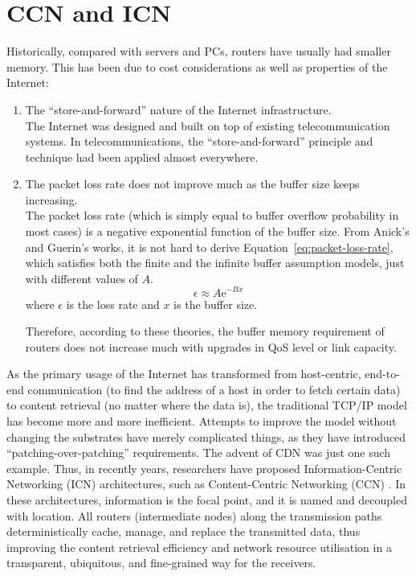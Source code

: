 \section{CCN and ICN}\label{sec:icn}
Historically, compared with servers and PCs, routers have usually had smaller memory. This has been due to cost considerations as well as properties of the Internet:
\begin{enumerate}
	\item The ``store-and-forward'' nature of the Internet infrastructure.\\
	The Internet was designed and built on top of existing telecommunication systems. In telecommunications, the ``store-and-forward'' principle and technique had been applied almost everywhere. 
	\item The packet loss rate does not improve much as the buffer size keeps increasing.\\
	The packet loss rate (which is simply equal to buffer overflow probability in most cases) is a negative exponential function of the buffer size. 
	From Anick's \cite{Anick1982Stochastic} and Guerin's \cite{Guerin1991Equivalent} works, it is not hard to derive Equation~\ref{eq:packet-loss-rate}, which satisfies both the finite and the infinite buffer assumption models, just with different values of $A$. 
	\begin{equation}\label{eq:packet-loss-rate}
	\epsilon \approx A\mathrm{e}^{-Bx}
	\end{equation}
	where $\epsilon$ is the loss rate and $x$ is the buffer size. 
	
	Therefore, according to these theories, the buffer memory requirement of routers does not increase much with upgrades in QoS level or link capacity. 
\end{enumerate}
	As the primary usage of the Internet has transformed from host-centric, end-to-end communication (to find the address of a host in order to fetch certain data) to content retrieval (no matter where the data is), the traditional TCP/IP model has become more and more inefficient. Attempts to improve the model without changing the substrates have merely complicated things, as they have introduced ``patching-over-patching'' requirements. The advent of CDN was just one such example. Thus, in recently years, researchers have proposed Information-Centric Networking (ICN) \cite{Xylomenos2014ICN} architectures, such as Content-Centric Networking (CCN) \cite{Perino:2011:CCN}. In these architectures, information is the focal point, and it is named and decoupled with location. All routers (intermediate nodes) along the transmission paths deterministically cache, manage, and replace the transmitted data, thus improving the content retrieval efficiency and network resource utilisation in a transparent, ubiquitous, and fine-grained way for the receivers. 
	
